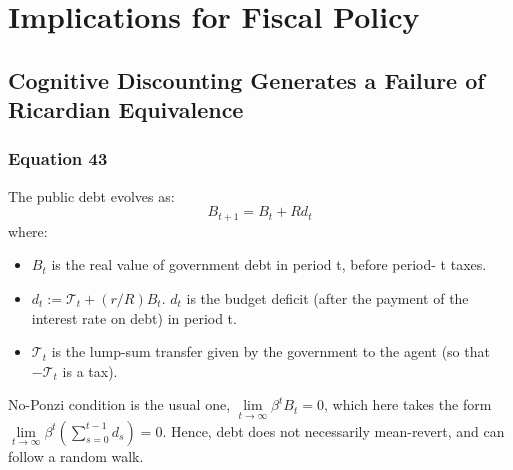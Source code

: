 \documentclass{article}
\begin{document}
\section{Implications for Fiscal Policy}

\subsection{Cognitive Discounting Generates a Failure of Ricardian Equivalence}

\subsubsection*{Equation 43}
The public debt evolves as:
\begin{equation}\tag{43}
    B_{t+1}=B_{t}+R d_{t}
\end{equation}
where:
\begin{itemize}
    \item $B_{t}$ is the real value of government debt in period t, before period- t taxes.
    \item $d_{t}:=\mathcal{T}_{t}+(r/R)B_{t}$. $d_{t}$ is the budget deficit (after the payment of the interest rate on debt) in period t.
    \item $\mathcal{T}_{t}$ is the lump-sum transfer given by the government to the agent (so that $-\mathcal{T}_{t}$ is a tax).
\end{itemize}
No-Ponzi condition is the usual one, $\lim\limits_{t\to\infty}\beta^{t}B_{t}=0$, which here takes the form $\lim\limits_{t\to\infty}\beta^{t}\left(\sum_{s=0}^{t-1}d_{s}\right)=0$. Hence, debt does not necessarily mean-revert, and can follow a random walk.
\end{document}
